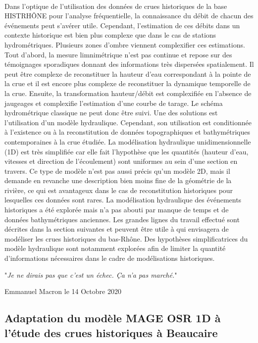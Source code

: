 \documentclass[11pt]{article}
\begin{document}
	\paragraph{} Dans l'optique de l'utilisation des données de crues historiques de la base HISTRHÔNE pour l'analyse fréquentielle, la connaissance du débit de chacun des événements peut s'avérer utile. Cependant, l'estimation de ces débits dans un contexte historique est bien plus complexe que dans le cas de stations hydrométriques. Plusieurs zones d'ombre viennent complexifier ces estimations. Tout d'abord, la mesure limnimétrique n'est pas continue et repose sur des témoignages sporadiques donnant des informations très dispersées spatialement. Il peut être complexe de reconstituer la hauteur d'eau correspondant à la pointe de la crue et il est encore plus complexe de reconstituer la dynamique temporelle de la crue. Ensuite, la transformation hauteur/débit est complexifiée en l'absence de jaugeages et complexifie l'estimation d'une courbe de tarage. Le schéma hydrométrique classique ne peut donc être suivi. Une des solutions est l'utilisation d'un modèle hydraulique. Cependant, son utilisation est conditionnée à l'existence ou à la reconstitution de données topographiques et bathymétriques contemporaines à la crue étudiée. La modélisation hydraulique unidimensionnelle (1D) est très simplifiée car elle fait l'hypothèse que les quantités (hauteur d'eau, vitesses et direction de l'écoulement) sont uniformes au sein d'une section en travers. Ce type de modèle n'est pas aussi précis qu'un modèle 2D, mais il demande en revanche une description bien moins fine de la géométrie de la rivière, ce qui est avantageux dans le cas de reconstitution historiques pour lesquelles ces données sont rares. La modélisation hydraulique des événements historiques a été explorée mais n'a pas abouti par manque de temps et de données bathymétriques anciennes. Les grandes lignes du travail effectué sont décrites dans la section suivantes et peuvent être utile à qui envisagera de modéliser les crues historiques du bas-Rhône. Des hypothèses simplificatrices du modèle hydraulique sont notamment explorées afin de limiter la quantité d'informations nécessaires dans le cadre de modélisations historiques.
	
	\epigraph{"\textit{Je ne dirais pas que c'est un échec. Ça n'a pas marché.}"}{Emmanuel Macron le 14 Octobre 2020}
	
	 \subsection{Adaptation du modèle MAGE OSR 1D à l'étude des crues historiques à Beaucaire}
	 
\end{document}
